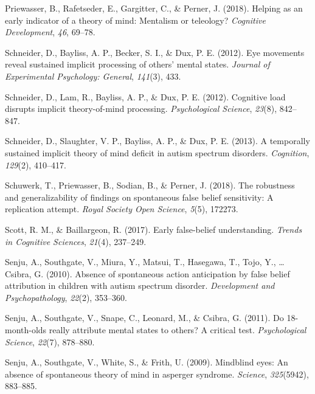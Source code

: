 \documentclass[
  english,
  man,floatsintext]{apa6}
\newlength{\cslhangindent}
\newlength{\cslentryspacingunit} %
\newenvironment{CSLReferences}[2] %
 {%
  \setlength{\parindent}{0pt}
  \ifodd #1
  \let\oldpar\par
  \def\par{\hangindent=\cslhangindent\oldpar}
  \fi
  \setlength{\parskip}{#2\cslentryspacingunit}
 }%
 {}
\begin{document}
\begin{CSLReferences}{1}{0}
\leavevmode{}%
Priewasser, B., Rafetseder, E., Gargitter, C., \& Perner, J. (2018). Helping as an early indicator of a theory of mind: Mentalism or teleology? \emph{Cognitive Development}, \emph{46}, 69--78.

\leavevmode{}%
Schneider, D., Bayliss, A. P., Becker, S. I., \& Dux, P. E. (2012). Eye movements reveal sustained implicit processing of others' mental states. \emph{Journal of Experimental Psychology: General}, \emph{141}(3), 433.

\leavevmode{}%
Schneider, D., Lam, R., Bayliss, A. P., \& Dux, P. E. (2012). Cognitive load disrupts implicit theory-of-mind processing. \emph{Psychological Science}, \emph{23}(8), 842--847.

\leavevmode{}%
Schneider, D., Slaughter, V. P., Bayliss, A. P., \& Dux, P. E. (2013). A temporally sustained implicit theory of mind deficit in autism spectrum disorders. \emph{Cognition}, \emph{129}(2), 410--417.

\leavevmode{}%
Schuwerk, T., Priewasser, B., Sodian, B., \& Perner, J. (2018). The robustness and generalizability of findings on spontaneous false belief sensitivity: A replication attempt. \emph{Royal Society Open Science}, \emph{5}(5), 172273.

\leavevmode{}%
Scott, R. M., \& Baillargeon, R. (2017). Early false-belief understanding. \emph{Trends in Cognitive Sciences}, \emph{21}(4), 237--249.

\leavevmode{}%
Senju, A., Southgate, V., Miura, Y., Matsui, T., Hasegawa, T., Tojo, Y., \ldots{} Csibra, G. (2010). Absence of spontaneous action anticipation by false belief attribution in children with autism spectrum disorder. \emph{Development and Psychopathology}, \emph{22}(2), 353--360.

\leavevmode{}%
Senju, A., Southgate, V., Snape, C., Leonard, M., \& Csibra, G. (2011). Do 18-month-olds really attribute mental states to others? A critical test. \emph{Psychological Science}, \emph{22}(7), 878--880.

\leavevmode{}%
Senju, A., Southgate, V., White, S., \& Frith, U. (2009). Mindblind eyes: An absence of spontaneous theory of mind in asperger syndrome. \emph{Science}, \emph{325}(5942), 883--885.


\end{CSLReferences}
\end{document}
